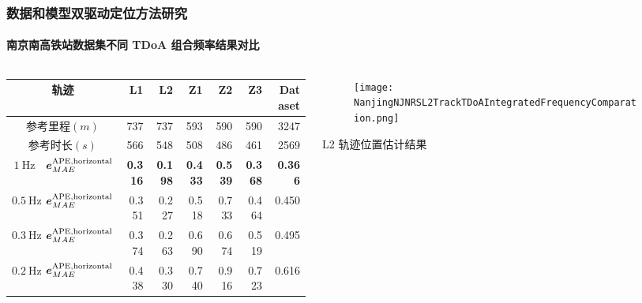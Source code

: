 \begin{frame}
 	\frametitle{数据和模型双驱动定位方法研究}
 	\framesubtitle{南京南高铁站数据集不同 TDoA 组合频率结果对比}
	\begin{columns}[t]
		\begin{column}{0.5\textwidth}
	    {
	    	\tiny
	    	\setlength{\tabcolsep}{2pt}
			\begin{tabular*}{\linewidth}{@{\extracolsep{\fill}}rlrrrrrr}
				\toprule
			    \multicolumn{2}{c}{轨迹} & L1 & L2 & Z1 & Z2 & Z3 & Dataset \\
				\midrule
				\multicolumn{2}{c}{参考里程$\left(\unit{m}\right)$} & 737 & 737 & 593 & 590 & 590 & 3247 \\
				\midrule
				\multicolumn{2}{c}{参考时长$\left(\unit{s}\right)$} & 566 & 548 & 508 & 486 & 461 & 2569 \\
				\midrule
				\multirow{1}{*}{$\SI{1}{\hertz}$}
				& $\vb*{e}^{\mathrm{APE,horizontal}}_{MAE}$ & \textbf{0.316} & \textbf{0.198} & \textbf{0.433} & \textbf{0.539} & \textbf{0.368} & \textbf{0.366} \\
				\midrule
				\multirow{1}{*}{$\SI{0.5}{\hertz}$}
				& $\vb*{e}^{\mathrm{APE,horizontal}}_{MAE}$ & 0.351 & 0.227 & 0.518 & 0.733 & 0.464 & 0.450 \\
				\midrule
				\multirow{1}{*}{$\SI{0.3}{\hertz}$}
				& $\vb*{e}^{\mathrm{APE,horizontal}}_{MAE}$ & 0.374 & 0.263 & 0.690 & 0.674 & 0.519 & 0.495 \\
				\midrule
				\multirow{1}{*}{$\SI{0.2}{\hertz}$}
				& $\vb*{e}^{\mathrm{APE,horizontal}}_{MAE}$ & 0.438 & 0.330 & 0.740 & 0.916 & 0.723 & 0.616 \\		
				\bottomrule 
			\end{tabular*}	
		}
		\end{column}   
		\begin{column}{0.5\textwidth}
		    \vspace{-2.5cm}
			\begin{columns}[t]
					\begin{column}{0.3\textwidth}
					   	\begin{figure}
						    \texttt{[image: NanjingNJNRSL2TrackTDoAIntegratedFrequencyComparation.png]}
					   	\end{figure}
					   	\vspace{-0.5cm}
		   			   	\hspace{0.0cm} {\tiny L2 轨迹位置估计结果}
					\end{column}   
					\begin{column}{0.3\textwidth}

\end{column}
\end{columns}
\end{column}
\end{columns}
\end{frame}
